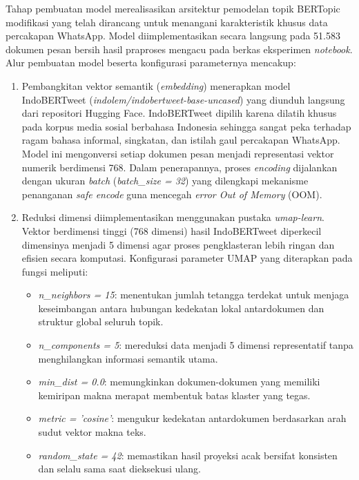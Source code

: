 Tahap pembuatan model merealisasikan arsitektur pemodelan topik BERTopic modifikasi yang telah dirancang untuk menangani karakteristik khusus data percakapan WhatsApp. Model diimplementasikan secara langsung pada 51.583 dokumen pesan bersih hasil praproses mengacu pada berkas eksperimen \textit{notebook}. Alur pembuatan model beserta konfigurasi parameternya mencakup:

\begin{enumerate}[label=\arabic*., leftmargin=*, itemsep=6pt]
    \item Pembangkitan vektor semantik (\textit{embedding}) menerapkan model IndoBERTweet (\textit{indolem/indobertweet-base-uncased}) yang diunduh langsung dari repositori Hugging Face. 
    IndoBERTweet dipilih karena dilatih khusus pada korpus media sosial berbahasa Indonesia sehingga sangat peka terhadap ragam bahasa informal, singkatan, dan istilah gaul percakapan WhatsApp. 
    Model ini mengonversi setiap dokumen pesan menjadi representasi vektor numerik berdimensi 768. 
    Dalam penerapannya, proses \textit{encoding} dijalankan dengan ukuran \textit{batch} (\textit{batch\_size = 32}) yang dilengkapi mekanisme penanganan \textit{safe encode} guna mencegah \textit{error Out of Memory} (OOM).

    \item Reduksi dimensi diimplementasikan menggunakan pustaka \textit{umap-learn}. Vektor berdimensi tinggi (768 dimensi) hasil IndoBERTweet diperkecil dimensinya menjadi 5 dimensi agar proses pengklasteran lebih ringan dan efisien secara komputasi. Konfigurasi parameter UMAP yang diterapkan pada fungsi meliputi:
    \begin{itemize}[nosep]
        \item \textit{n\_neighbors = 15}: menentukan jumlah tetangga terdekat untuk menjaga keseimbangan antara hubungan kedekatan lokal antardokumen dan struktur global seluruh topik.
        \item \textit{n\_components = 5}: mereduksi data menjadi 5 dimensi representatif tanpa menghilangkan informasi semantik utama.
        \item \textit{min\_dist = 0.0}: memungkinkan dokumen-dokumen yang memiliki kemiripan makna merapat membentuk batas klaster yang tegas.
        \item \textit{metric = 'cosine'}: mengukur kedekatan antardokumen berdasarkan arah sudut vektor makna teks.
        \item \textit{random\_state = 42}: memastikan hasil proyeksi acak bersifat konsisten dan selalu sama saat dieksekusi ulang.
    \end{itemize}


\end{enumerate}

